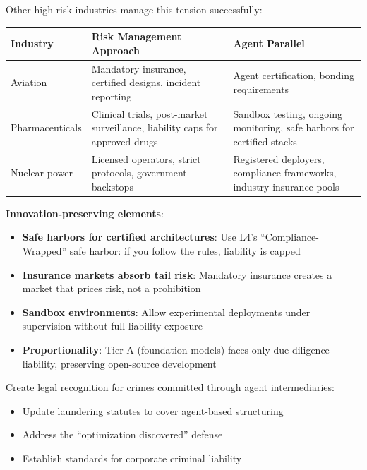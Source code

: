 \documentclass[11pt,letterpaper]{article}
\begin{document}
\begin{infobox}
Other high-risk industries manage this tension successfully:

\begin{center}
\small
\begin{tabular}{L{3cm}L{5cm}L{4.5cm}}
\toprule
\textbf{Industry} & \textbf{Risk Management Approach} & \textbf{Agent Parallel} \\
\midrule
Aviation & Mandatory insurance, certified designs, incident reporting & Agent certification, bonding requirements \\
Pharmaceuticals & Clinical trials, post-market surveillance, liability caps for approved drugs & Sandbox testing, ongoing monitoring, safe harbors for certified stacks \\
Nuclear power & Licensed operators, strict protocols, government backstops & Registered deployers, compliance frameworks, industry insurance pools \\
\bottomrule
\end{tabular}
\end{center}

\textbf{Innovation-preserving elements}:
\begin{itemize}
  \item \textbf{Safe harbors for certified architectures}: Use L4's ``Compliance-Wrapped'' safe harbor: if you follow the rules, liability is capped
  \item \textbf{Insurance markets absorb tail risk}: Mandatory insurance creates a market that prices risk, not a prohibition
  \item \textbf{Sandbox environments}: Allow experimental deployments under supervision without full liability exposure
  \item \textbf{Proportionality}: Tier A (foundation models) faces only due diligence liability, preserving open-source development
\end{itemize}
\end{infobox}

\begin{recbox}
Create legal recognition for crimes committed through agent intermediaries:
\begin{itemize}
  \item Update laundering statutes to cover agent-based structuring
  \item Address the ``optimization discovered'' defense
  \item Establish standards for corporate criminal liability
\end{itemize}
\end{recbox}
\end{document}
